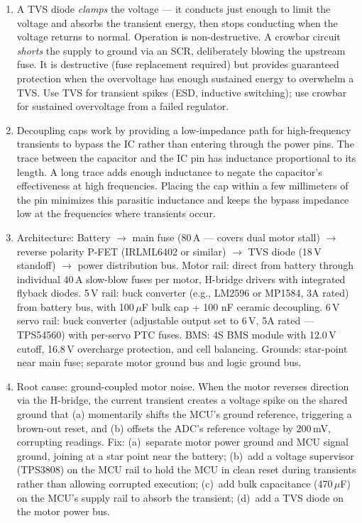 \documentclass[11pt,letterpaper,twoside,openany]{book}
\begin{document}
\begin{enumerate}[leftmargin=1.5em]
  \item A TVS diode \emph{clamps} the voltage --- it conducts just enough to limit the voltage and absorbs the transient energy, then stops conducting when the voltage returns to normal. Operation is non-destructive. A crowbar circuit \emph{shorts} the supply to ground via an SCR, deliberately blowing the upstream fuse. It is destructive (fuse replacement required) but provides guaranteed protection when the overvoltage has enough sustained energy to overwhelm a TVS. Use TVS for transient spikes (ESD, inductive switching); use crowbar for sustained overvoltage from a failed regulator.

  \item Decoupling caps work by providing a low-impedance path for high-frequency transients to bypass the IC rather than entering through the power pins. The trace between the capacitor and the IC pin has inductance proportional to its length. A long trace adds enough inductance to negate the capacitor's effectiveness at high frequencies. Placing the cap within a few millimeters of the pin minimizes this parasitic inductance and keeps the bypass impedance low at the frequencies where transients occur.

  \item Architecture: Battery $\to$ main fuse (80\,A --- covers dual motor stall) $\to$ reverse polarity P-FET (IRLML6402 or similar) $\to$ TVS diode (18\,V standoff) $\to$ power distribution bus. Motor rail: direct from battery through individual 40\,A slow-blow fuses per motor, H-bridge drivers with integrated flyback diodes. 5\,V rail: buck converter (e.g., LM2596 or MP1584, 3A rated) from battery bus, with 100\,$\mu$F bulk cap + 100\,\,nF ceramic decoupling. 6\,V servo rail: buck converter (adjustable output set to 6\,V, 5A rated --- TPS54560) with per-servo PTC fuses. BMS: 4S BMS module with 12.0\,V cutoff, 16.8\,V overcharge protection, and cell balancing. Grounds: star-point near main fuse; separate motor ground bus and logic ground bus.

  \item Root cause: ground-coupled motor noise. When the motor reverses direction via the H-bridge, the current transient creates a voltage spike on the shared ground that (a) momentarily shifts the MCU's ground reference, triggering a brown-out reset, and (b) offsets the ADC's reference voltage by 200\,mV, corrupting readings. Fix: (a)~separate motor power ground and MCU signal ground, joining at a star point near the battery; (b)~add a voltage supervisor (TPS3808) on the MCU rail to hold the MCU in clean reset during transients rather than allowing corrupted execution; (c)~add bulk capacitance (470\,$\mu$F) on the MCU's supply rail to absorb the transient; (d)~add a TVS diode on the motor power bus.


\end{enumerate}
\end{document}
